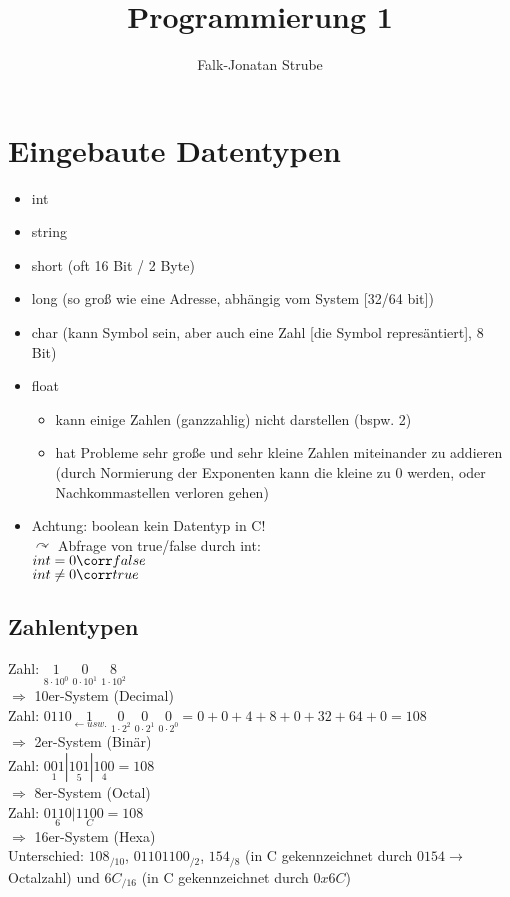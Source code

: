 \documentclass{scrreprt}
\title{Programmierung 1}
\author{Falk-Jonatan Strube}
\begin{document}
\maketitle
\tableofcontents

\chapter{Eingebaute Datentypen}

\begin{itemize}
\item int
\item string
\item short (oft 16 Bit / 2 Byte)
\item long (so groß wie eine Adresse, abhängig vom System [32/64 bit])
\item char (kann Symbol sein, aber auch eine Zahl [die Symbol represäntiert], 8 Bit)
\item float
\begin{itemize}
\item kann einige Zahlen (ganzzahlig) nicht darstellen (bspw. 2)
\item hat Probleme sehr große und sehr kleine Zahlen miteinander zu addieren (durch Normierung der Exponenten kann die kleine zu 0 werden, oder Nachkommastellen verloren gehen)
\end{itemize}
\item Achtung: boolean kein Datentyp in C!\\
$\curvearrowright$ Abfrage von true/false durch int: \\
$int=0\corr false$\\
$int \not =0 \corr true$
\end{itemize}

\section{Zahlentypen}
Zahl: $\underset{8\cdot 10^0}{1} \; \underset{0 \cdot 10^1}{0} \;\underset{1\cdot 10^2}{8}$\\
$\Rightarrow$ 10er-System (Decimal)\\
Zahl: $0110\underset{\leftarrow usw.}{1}\;\underset{1\cdot 2^2}{0}\;\underset{0\cdot 2^1}{0}\;\underset{0\cdot 2^0}{0} = 0 + 0 + 4+8+0+32+64+0 =108$\\
$\Rightarrow$ 2er-System (Binär)\\
Zahl: $\underset{1}{001}|\underset{5}{101}|\underset{4}{100}=108$\\
$\Rightarrow$ 8er-System (Octal)\\
Zahl: $\underset{6}{0110}|\underset{C}{1100}=108$\\
$\Rightarrow$ 16er-System (Hexa)\\
Unterschied: $108_{/10}$, $01101100_{/2}$, $154_{/8}$ (in C gekennzeichnet durch $0154\rightarrow$ Octalzahl) und $6C_{/16}$ (in C gekennzeichnet durch $0x6C$)
\end{document}

